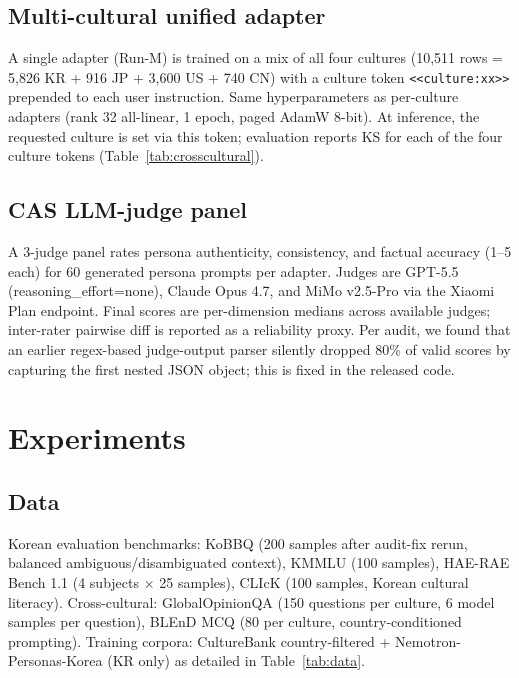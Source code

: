\documentclass{article}
\begin{document}
\subsection{Multi-cultural unified adapter}
A single adapter (Run-M) is trained on a mix of all four cultures (10,511 rows = 5{,}826 KR + 916 JP + 3{,}600 US + 740 CN) with a culture token \verb|<<culture:xx>>| prepended to each user instruction. Same hyperparameters as per-culture adapters (rank 32 all-linear, 1 epoch, paged AdamW 8-bit). At inference, the requested culture is set via this token; evaluation reports KS for each of the four culture tokens (Table~\ref{tab:crosscultural}).

\subsection{CAS LLM-judge panel}
A 3-judge panel rates persona authenticity, consistency, and factual accuracy (1--5 each) for 60 generated persona prompts per adapter. Judges are GPT-5.5 (reasoning\_effort=none), Claude Opus 4.7, and MiMo v2.5-Pro via the Xiaomi Plan endpoint. Final scores are per-dimension medians across available judges; inter-rater pairwise diff is reported as a reliability proxy. Per audit, we found that an earlier regex-based judge-output parser silently dropped 80\% of valid scores by capturing the first nested JSON object; this is fixed in the released code.

\section{Experiments}
\label{sec:experiments}

\subsection{Data}
Korean evaluation benchmarks: KoBBQ \citep{jin2024kobbq} (200 samples after audit-fix rerun, balanced ambiguous/disambiguated context), KMMLU \citep{son2024kmmlu} (100 samples), HAE-RAE Bench 1.1 \citep{son2023haerae} (4 subjects $\times$ 25 samples), CLIcK \citep{kim2024click} (100 samples, Korean cultural literacy). Cross-cultural: GlobalOpinionQA \citep{durmus2023global} (150 questions per culture, 6 model samples per question), BLEnD MCQ \citep{myung2024blend} (80 per culture, country-conditioned prompting). Training corpora: CultureBank \citep{shi2024culturebank} country-filtered + Nemotron-Personas-Korea (KR only) as detailed in Table~\ref{tab:data}.
\end{document}
